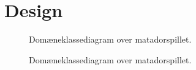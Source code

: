 \chapter{Design}\label{chap:Design}

\begin{figure}
\caption{Domæneklassediagram over matadorspillet.}\label{fig:DomainDia}
\centering

\end{figure}


\begin{figure}
\caption{Domæneklassediagram over matadorspillet.}\label{fig:DesignKlasseChanged}
\centering

\end{figure}